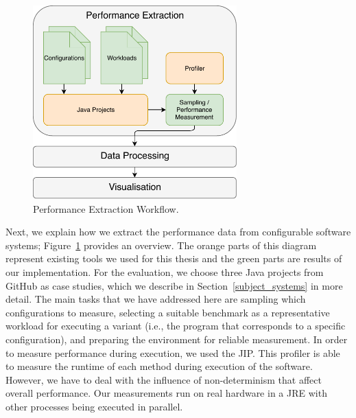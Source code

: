 \begin{figure}[h]
  \centering
  \includegraphics[width=0.7\textwidth]{images/workflow_perf_expanded}
  \caption{Performance Extraction Workflow.}
  \label{perf_extr_workflow}
\end{figure}


Next, we explain how we extract the performance data from configurable software systems; Figure~\ref{perf_extr_workflow} provides an overview. The orange parts of this diagram represent existing tools we used for this thesis and the green parts are results of our implementation. For the evaluation, we choose three Java projects from GitHub as case studies, which we describe in Section~\ref{subject_systems} in more detail. The main tasks that we have addressed here are sampling which configurations to measure, selecting a suitable benchmark as a representative workload for executing a variant (i.e., the program that corresponds to a specific configuration), and preparing the environment for reliable measurement. In order to measure performance during execution, we used the \ac{JIP}. This profiler is able to measure the runtime of each method during execution of the software. However, we have to deal with the influence of non-determinism that affect overall performance. Our measurements run on real hardware in a \ac{JRE} with other processes being executed in parallel. 


